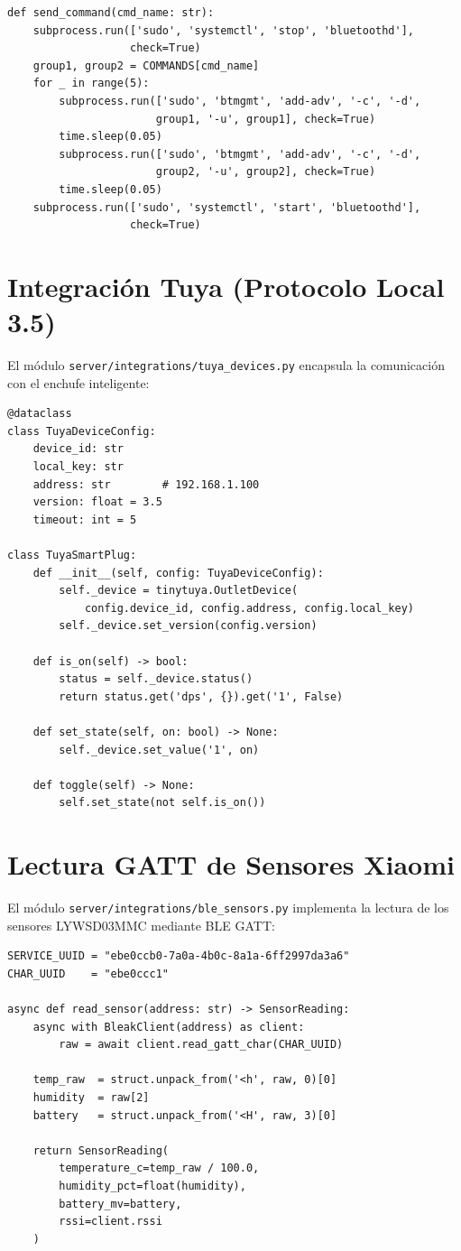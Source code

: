 \begin{verbatim}
def send_command(cmd_name: str):
    subprocess.run(['sudo', 'systemctl', 'stop', 'bluetoothd'],
                   check=True)
    group1, group2 = COMMANDS[cmd_name]
    for _ in range(5):
        subprocess.run(['sudo', 'btmgmt', 'add-adv', '-c', '-d',
                       group1, '-u', group1], check=True)
        time.sleep(0.05)
        subprocess.run(['sudo', 'btmgmt', 'add-adv', '-c', '-d',
                       group2, '-u', group2], check=True)
        time.sleep(0.05)
    subprocess.run(['sudo', 'systemctl', 'start', 'bluetoothd'],
                   check=True)
\end{verbatim}

\section{Integración Tuya (Protocolo Local 3.5)}

El módulo \texttt{server/integrations/tuya\_devices.py} encapsula la comunicación con el enchufe inteligente:

\begin{verbatim}
@dataclass
class TuyaDeviceConfig:
    device_id: str
    local_key: str
    address: str        # 192.168.1.100
    version: float = 3.5
    timeout: int = 5

class TuyaSmartPlug:
    def __init__(self, config: TuyaDeviceConfig):
        self._device = tinytuya.OutletDevice(
            config.device_id, config.address, config.local_key)
        self._device.set_version(config.version)
    
    def is_on(self) -> bool:
        status = self._device.status()
        return status.get('dps', {}).get('1', False)
    
    def set_state(self, on: bool) -> None:
        self._device.set_value('1', on)
    
    def toggle(self) -> None:
        self.set_state(not self.is_on())
\end{verbatim}

\section{Lectura GATT de Sensores Xiaomi}

El módulo \texttt{server/integrations/ble\_sensors.py} implementa la lectura de los sensores LYWSD03MMC mediante BLE GATT:

\begin{verbatim}
SERVICE_UUID = "ebe0ccb0-7a0a-4b0c-8a1a-6ff2997da3a6"
CHAR_UUID    = "ebe0ccc1"

async def read_sensor(address: str) -> SensorReading:
    async with BleakClient(address) as client:
        raw = await client.read_gatt_char(CHAR_UUID)
    
    temp_raw  = struct.unpack_from('<h', raw, 0)[0]
    humidity  = raw[2]
    battery   = struct.unpack_from('<H', raw, 3)[0]
    
    return SensorReading(
        temperature_c=temp_raw / 100.0,
        humidity_pct=float(humidity),
        battery_mv=battery,
        rssi=client.rssi
    )
\end{verbatim}

